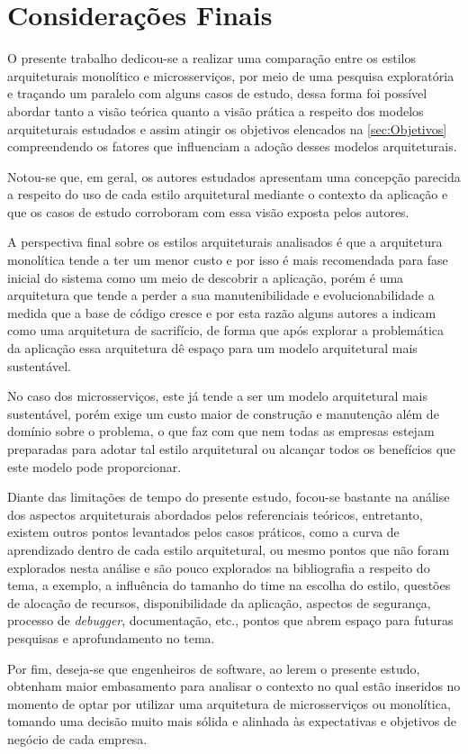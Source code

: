 \chapter{Considerações Finais}

O presente trabalho dedicou-se a realizar uma comparação entre os estilos arquiteturais monolítico e
microsserviços, por meio de uma pesquisa exploratória e traçando um paralelo com alguns casos de
estudo, dessa forma foi possível abordar tanto a visão teórica quanto a visão prática a respeito dos
modelos arquiteturais estudados e assim atingir os objetivos elencados na \autoref{sec:Objetivos}
compreendendo os fatores que influenciam a adoção desses modelos arquiteturais.

Notou-se que, em geral, os autores estudados apresentam uma concepção parecida a respeito do
uso de cada estilo arquitetural mediante o contexto da aplicação e que os casos de estudo
corroboram com essa visão exposta pelos autores.

A perspectiva final sobre os estilos arquiteturais analisados é que a arquitetura monolítica tende a
ter um menor custo e por isso é mais recomendada para fase inicial do sistema como um meio de
descobrir a aplicação, porém é uma arquitetura que tende a perder a sua manutenibilidade e
evolucionabilidade a medida que a base de código cresce e por esta razão alguns autores a indicam como uma
arquitetura de sacrifício, de forma que após explorar a problemática da aplicação essa arquitetura
dê espaço para um modelo arquitetural mais sustentável.

No caso dos microsserviços, este já tende a ser um modelo arquitetural mais sustentável, porém exige
um custo maior de construção e manutenção além de domínio sobre o problema, o que faz com que nem todas
as empresas estejam preparadas para adotar tal estilo arquitetural ou alcançar todos os benefícios
que este modelo pode proporcionar.

Diante das limitações de tempo do presente estudo, focou-se bastante na análise dos aspectos
arquiteturais abordados pelos referenciais teóricos, entretanto, existem outros pontos levantados
pelos casos práticos, como a curva de aprendizado dentro de cada estilo arquitetural, ou mesmo pontos que
não foram explorados nesta análise e são pouco explorados na bibliografia a respeito do tema, a exemplo,
a influência do tamanho do time na escolha do estilo, questões de alocação de recursos, disponibilidade
da aplicação, aspectos de segurança, processo de \textit{debugger}, documentação, etc., pontos que abrem
espaço para futuras pesquisas e aprofundamento no tema.

Por fim, deseja-se que engenheiros de software, ao lerem o presente estudo, obtenham maior embasamento
para analisar o contexto no qual estão inseridos no momento de optar por utilizar uma arquitetura de
microsserviços ou monolítica, tomando uma decisão muito mais sólida e alinhada às expectativas e objetivos
de negócio de cada empresa.
